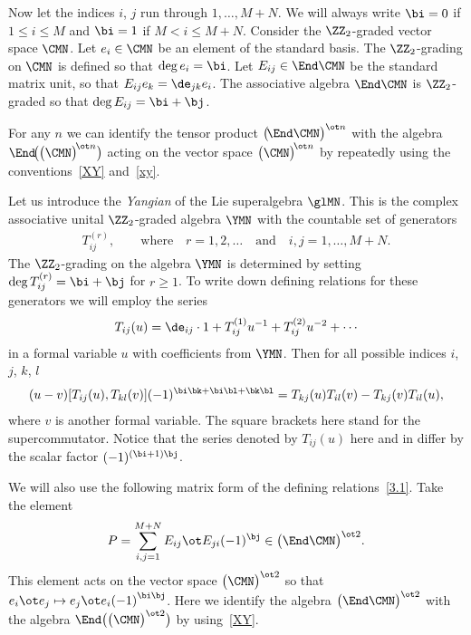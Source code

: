 Now let the indices $i$, $j$ run through $1,\dots, M+N $.
We will always write $\bi=0$ if $1\le i\le M$ and
$\bi=1$ if $M<i\le M+N $. Consider the
$\ZZ_{2}$-graded vector space $\CMN $.
Let $e_i\in\CMN$ be an element of the standard basis.
The $\ZZ_{2}$-grading on $\CMN$ is defined so that $\deg e_i=\bi $.
Let $E_{ij}\in\End\CMN$ be the standard matrix unit, so that
$E_{ij} e_k=\de_{jk} e_i $. The
associative algebra $\End\CMN$
is $\ZZ_{2}$-graded so that $\deg E_{ij}=\bi+ \bj $.

For any $n$ we can identify
the tensor product $\big(\!\End\CMN\big)^{\ot n}$ with the algebra
$\End\!\big(\big(\CMN\big)^{\!\ot n}\big)$ acting on the vector space $\big(\CMN\big)^{\!\ot n}$
by repeatedly using the conventions~\eqref{XY} and~\eqref{xy}.

Let us introduce the {\it Yangian} of the Lie superalgebra
$\glMN$. This is the complex associative
unital $\ZZ_{2}$-graded algebra $\YMN$ with the countable set of generators
\begin{gather}\label{Tijr}
T^{(r)}_{ij},
\qquad\text{where}\quad r=1,2, \dots \quad\text{and}\quad i ,j=1,\dots, M+N .
\end{gather}
The $\ZZ_{2}$-grading on the algebra $\YMN$
is determined by setting $\deg T_{ij}^{(r)}=\bi+\bj$ for $r\ge1$.
To write down defining relations for these
generators we will employ the series
\begin{gather}\label{3.0}
T_{ij}(u)=\de_{ij}\cdot1+T_{ij}^{(1)} u^{-1}+T_{ij}^{(2)} u^{-2}+\cdots
\end{gather}
in a formal variable $u$ with coefficients from $\YMN $.
Then for all possible indices $i$, $j$, $k$, $l${\samepage
\begin{gather}\label{3.1}
(u-v)[ T_{ij}(u) ,T_{kl}(v) ](-1)^{\bi \bk + \bi \bl + \bk \bl}=T_{kj}(u) T_{il}(v)-T_{kj}(v) T_{il}(u),
\end{gather}
where $v$ is another formal variable.
The square brackets here stand for the supercommutator.
Notice that the series denoted by $T_{ij}(u)$
here and in \cite{N1} differ by the scalar factor
$(-1)^{( \bi+1 ) \bj}$.}

We will also use the following matrix form of the defining relations~\eqref{3.1}.
Take the element
\begin{gather}\label{pop}
P = \sum_{i,j=1}^{M+N} E_{ij}\ot E_{ji} (-1)^{\bj}
\in\big(\End\CMN\big)^{\ot 2} .
\end{gather}
This element acts on the vector space $\big(\CMN\big)^{\ot 2}$ so that
$e_i\ot e_{j}\mapsto e_j\ot e_i {(-1)}^{\bi \bj}$.
Here we identify the algebra $\big(\End\CMN\big)^{\ot 2}$ with the algebra
$\End\big(\big(\CMN\big)^{\ot 2}\big)$ by using~\eqref{XY}.

